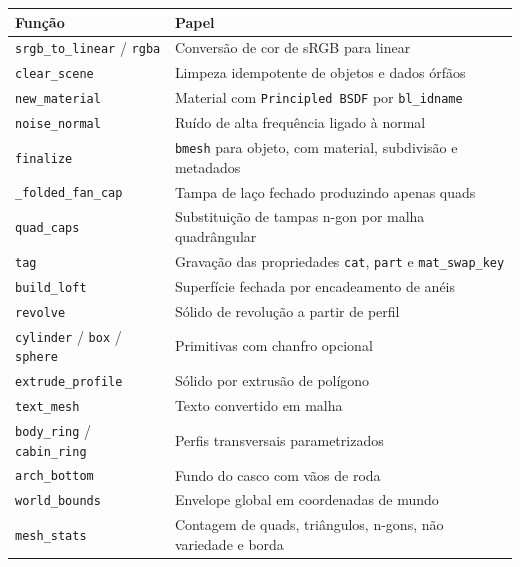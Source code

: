 \begin{quadro}[htbp]
\centering
\caption{Fun{\c{c}}\~oes principais da biblioteca de helpers}
\label{qua:helpers}
\footnotesize
\begin{tabular}{>{\raggedright\arraybackslash}p{4.4cm}>{\raggedright\arraybackslash}p{8.4cm}}
\toprule
\textbf{Fun{\c{c}}\~ao} & \textbf{Papel} \\
\midrule
\texttt{srgb\_to\_linear} / \texttt{rgba} & Convers\~ao de cor de sRGB para linear \\
\texttt{clear\_scene} & Limpeza idempotente de objetos e dados \'orf\~aos \\
\texttt{new\_material} & Material com \texttt{Principled BSDF} por \texttt{bl\_idname} \\
\texttt{noise\_normal} & Ru\'ido de alta frequ\^encia ligado \`a normal \\
\texttt{finalize} & \texttt{bmesh} para objeto, com material, subdivis\~ao e metadados \\
\texttt{\_folded\_fan\_cap} & Tampa de la\c{c}o fechado produzindo apenas quads \\
\texttt{quad\_caps} & Substitui{\c{c}}\~ao de tampas n-gon por malha quadr\^angular \\
\texttt{tag} & Grava{\c{c}}\~ao das propriedades \texttt{cat}, \texttt{part} e \texttt{mat\_swap\_key} \\
\texttt{build\_loft} & Superf\'icie fechada por encadeamento de an\'eis \\
\texttt{revolve} & S\'olido de revolu{\c{c}}\~ao a partir de perfil \\
\texttt{cylinder} / \texttt{box} / \texttt{sphere} & Primitivas com chanfro opcional \\
\texttt{extrude\_profile} & S\'olido por extrus\~ao de pol\'igono \\
\texttt{text\_mesh} & Texto convertido em malha \\
\texttt{body\_ring} / \texttt{cabin\_ring} & Perfis transversais parametrizados \\
\texttt{arch\_bottom} & Fundo do casco com v\~aos de roda \\
\texttt{world\_bounds} & Envelope global em coordenadas de mundo \\
\texttt{mesh\_stats} & Contagem de quads, tri\^angulos, n-gons, n\~ao variedade e borda \\
\bottomrule
\end{tabular}
\end{quadro}

